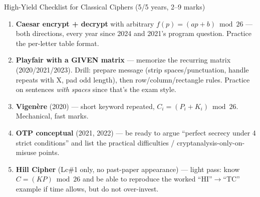 \documentclass[12pt,a4paper]{article}
\begin{document}
\begin{keybox}{High-Yield Checklist for Classical Ciphers (5/5 years, 2--9 marks)}
\begin{enumerate}[noitemsep]
  \item \textbf{Caesar encrypt + decrypt} with arbitrary $f(p)=(ap+b)\bmod 26$ --- both directions, every year since 2024 and 2021's program question. Practice the per-letter table format.
  \item \textbf{Playfair with a GIVEN matrix} --- memorize the recurring matrix (2020/2021/2023). Drill: prepare message (strip spaces/punctuation, handle repeats with X, pad odd length), then row/column/rectangle rules. Practice on sentences \emph{with spaces} since that's the exam style.
  \item \textbf{Vigen\`ere} (2020) --- short keyword repeated, $C_i=(P_i+K_i)\bmod 26$. Mechanical, fast marks.
  \item \textbf{OTP conceptual} (2021, 2022) --- be ready to argue ``perfect secrecy under 4 strict conditions'' and list the practical difficulties / cryptanalysis-only-on-misuse points.
  \item \textbf{Hill Cipher} (Lc\#1 only, no past-paper appearance) --- light pass: know $C=(KP)\bmod 26$ and be able to reproduce the worked ``HI''$\to$``TC'' example if time allows, but do not over-invest.
\end{enumerate}
\end{keybox}
\end{document}
